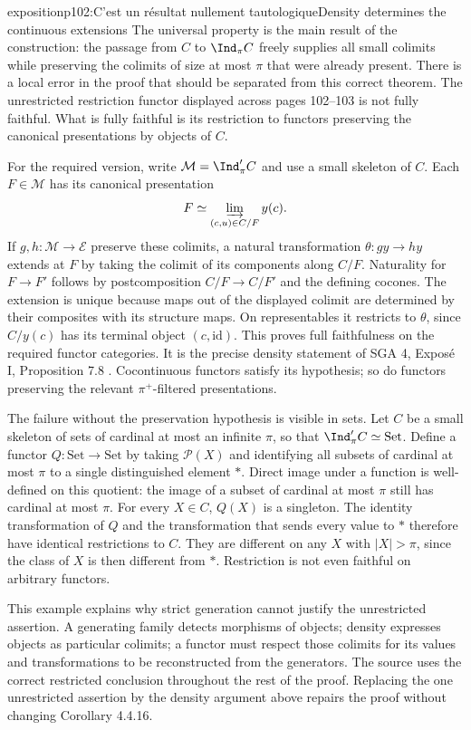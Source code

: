 \begin{dcomment}{exposition}{p102:C'est un résultat nullement tautologique}{Density determines the continuous extensions}
The universal property is the main result of the construction: the passage from $C$ to $\Ind_\pi C$ freely supplies all small colimits while preserving the colimits of size at most $\pi$ that were already present. There is a local error in the proof that should be separated from this correct theorem. The unrestricted restriction functor displayed across pages 102--103 is not fully faithful. What is fully faithful is its restriction to functors preserving the canonical presentations by objects of $C$.

For the required version, write $\mathcal M=\Ind'_\pi C$ and use a small skeleton of $C$. Each $F\in\mathcal M$ has its canonical presentation
\[
F\simeq\varinjlim_{(c,u)\in C/F}y(c).
\]
If $g,h:\mathcal M\to\mathcal E$ preserve these colimits, a natural transformation $\theta:g y\to h y$ extends at $F$ by taking the colimit of its components along $C/F$. Naturality for $F\to F'$ follows by postcomposition $C/F\to C/F'$ and the defining cocones. The extension is unique because maps out of the displayed colimit are determined by their composites with its structure maps. On representables it restricts to $\theta$, since $C/y(c)$ has its terminal object $(c,\mathrm{id})$. This proves full faithfulness on the required functor categories. It is the precise density statement of SGA 4, Expos\'e I, Proposition 7.8 \citep{SGA4I1972}. Cocontinuous functors satisfy its hypothesis; so do functors preserving the relevant $\pi^+$-filtered presentations.

The failure without the preservation hypothesis is visible in sets. Let $C$ be a small skeleton of sets of cardinal at most an infinite $\pi$, so that $\Ind'_\pi C\simeq\mathrm{Set}$. Define a functor $Q:\mathrm{Set}\to\mathrm{Set}$ by taking $\mathcal P(X)$ and identifying all subsets of cardinal at most $\pi$ to a single distinguished element $*$. Direct image under a function is well-defined on this quotient: the image of a subset of cardinal at most $\pi$ still has cardinal at most $\pi$. For every $X\in C$, $Q(X)$ is a singleton. The identity transformation of $Q$ and the transformation that sends every value to $*$ therefore have identical restrictions to $C$. They are different on any $X$ with $|X|>\pi$, since the class of $X$ is then different from $*$. Restriction is not even faithful on arbitrary functors.

This example explains why strict generation cannot justify the unrestricted assertion. A generating family detects morphisms of objects; density expresses objects as particular colimits; a functor must respect those colimits for its values and transformations to be reconstructed from the generators. The source uses the correct restricted conclusion throughout the rest of the proof. Replacing the one unrestricted assertion by the density argument above repairs the proof without changing Corollary 4.4.16.
\end{dcomment}

